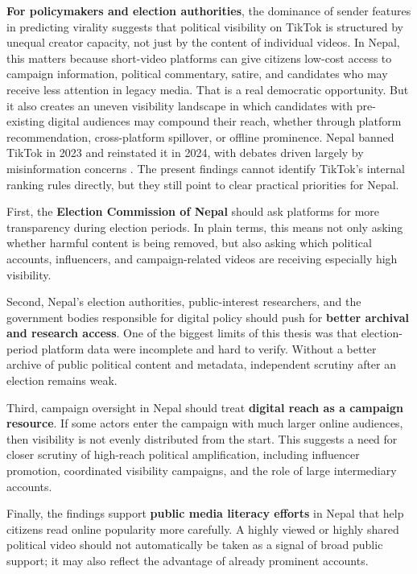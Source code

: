 \documentclass[12pt,a4paper]{report}
\begin{document}
\textbf{For policymakers and election authorities}, the dominance of sender features in predicting virality suggests that political visibility on TikTok is structured by unequal creator capacity, not just by the content of individual videos. In Nepal, this matters because short-video platforms can give citizens low-cost access to campaign information, political commentary, satire, and candidates who may receive less attention in legacy media. That is a real democratic opportunity. But it also creates an uneven visibility landscape in which candidates with pre-existing digital audiences may compound their reach, whether through platform recommendation, cross-platform spillover, or offline prominence. Nepal banned TikTok in 2023 and reinstated it in 2024, with debates driven largely by misinformation concerns \parencite{lamichhane2024tik, reuters2024tiktok}. The present findings cannot identify TikTok's internal ranking rules directly, but they still point to clear practical priorities for Nepal.

First, the \textbf{Election Commission of Nepal} should ask platforms for more transparency during election periods. In plain terms, this means not only asking whether harmful content is being removed, but also asking which political accounts, influencers, and campaign-related videos are receiving especially high visibility.

Second, Nepal’s election authorities, public-interest researchers, and the government bodies responsible for digital policy should push for \textbf{better archival and research access}. One of the biggest limits of this thesis was that election-period platform data were incomplete and hard to verify. Without a better archive of public political content and metadata, independent scrutiny after an election remains weak.

Third, campaign oversight in Nepal should treat \textbf{digital reach as a campaign resource}. If some actors enter the campaign with much larger online audiences, then visibility is not evenly distributed from the start. This suggests a need for closer scrutiny of high-reach political amplification, including influencer promotion, coordinated visibility campaigns, and the role of large intermediary accounts.

Finally, the findings support \textbf{public media literacy efforts} in Nepal that help citizens read online popularity more carefully. A highly viewed or highly shared political video should not automatically be taken as a signal of broad public support; it may also reflect the advantage of already prominent accounts.
\end{document}
